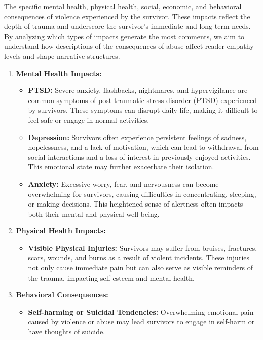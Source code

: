 \documentclass[11pt]{article}
\begin{document}
The specific mental health, physical health, social, economic, and behavioral consequences of violence experienced by the survivor. 
These impacts reflect the depth of trauma and underscore the survivor's immediate and long-term needs.
By analyzing which types of impacts generate the most comments, we aim to understand how descriptions of the consequences of abuse affect reader empathy levels and shape narrative structures.
\begin{enumerate}
    \item \textbf{Mental Health Impacts:} 
    \begin{itemize}
        \item \textbf{PTSD:} Severe anxiety, flashbacks, nightmares, and hypervigilance are common symptoms of post-traumatic stress disorder (PTSD) experienced by survivors. 
        These symptoms can disrupt daily life, making it difficult to feel safe or engage in normal activities. 
        \item \textbf{Depression:} Survivors often experience persistent feelings of sadness, hopelessness, and a lack of motivation, which can lead to withdrawal from social interactions and a loss of interest in previously enjoyed activities. 
        This emotional state may further exacerbate their isolation.
        \item \textbf{Anxiety:} Excessive worry, fear, and nervousness can become overwhelming for survivors, causing difficulties in concentrating, sleeping, or making decisions. 
        This heightened sense of alertness often impacts both their mental and physical well-being.
    \end{itemize}
    \item \textbf{Physical Health Impacts:}
    \begin{itemize}
        \item \textbf{Visible Physical Injuries:} Survivors may suffer from bruises, fractures, scars, wounds, and burns as a result of violent incidents. 
        These injuries not only cause immediate pain but can also serve as visible reminders of the trauma, impacting self-esteem and mental health.
    \end{itemize}
    \item \textbf{Behavioral Consequences:}
    \begin{itemize}
        \item \textbf{Self-harming or Suicidal Tendencies:} Overwhelming emotional pain caused by violence or abuse may lead survivors to engage in self-harm or have thoughts of suicide. 

\end{itemize}
\end{enumerate}
\end{document}
